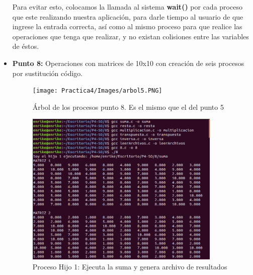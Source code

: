 \documentclass[12pt]{article}
\begin{document}
\begin{itemize}
                Para evitar esto, colocamos la llamada al sistema \textbf{wait()} por cada proceso que este realizando nuestra aplicación, para darle tiempo al usuario de que ingrese la entrada correcta, así como al mismo proceso para que realice las operaciones que tenga que realizar, y no existan colisiones entre las variables de éstos.
                \newpage                
                \item[\Checkmark] \textbf{Punto 8:} Operaciones con matrices de 10x10 con creación de seis procesos por sustitución código.
                \begin{figure}[h!]
                        \centering
                        \texttt{[image: Practica4/Images/arbol5.PNG]}
                        \caption{Árbol de los procesos punto 8. Es el mismo que el del punto 5}
                        
                        \end{figure}

                    \begin{figure}[h!]
                        \centering
                        \includegraphics[width=0.88\textwidth]{Practica4/Images/Linux/8_1.png}
                        \caption{Proceso Hijo 1: Ejecuta la suma y genera archivo de resultados}
                    \end{figure}
                \newpage
                    \begin{figure}[h!]
                        \centering
                        

\end{figure}
\end{itemize}
\end{document}
